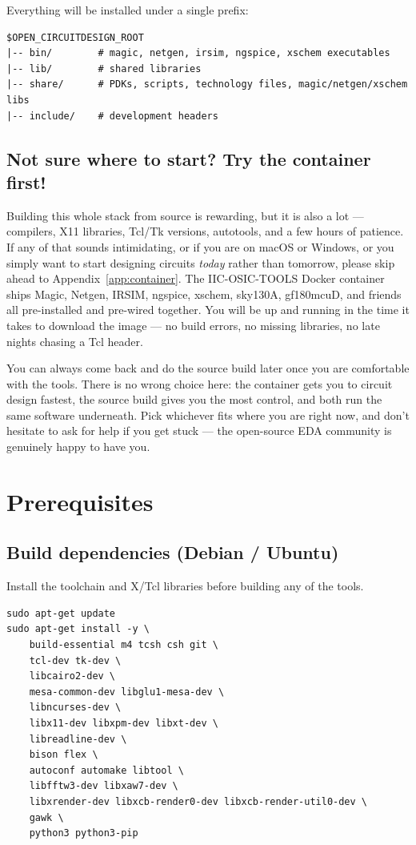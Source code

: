 \documentclass[11pt]{article}
\begin{document}
Everything will be installed under a single prefix:

\begin{lstlisting}
$OPEN_CIRCUITDESIGN_ROOT
|-- bin/        # magic, netgen, irsim, ngspice, xschem executables
|-- lib/        # shared libraries
|-- share/      # PDKs, scripts, technology files, magic/netgen/xschem libs
|-- include/    # development headers
\end{lstlisting}

\subsection*{Not sure where to start? Try the container first!}
 
Building this whole stack from source is rewarding, but it is also a lot
--- compilers, X11 libraries, Tcl/Tk versions, autotools, and a few hours
of patience. If any of that sounds intimidating, or if you are on macOS
or Windows, or you simply want to start designing circuits \emph{today}
rather than tomorrow, please skip ahead to
Appendix~\ref{app:container}. The IIC-OSIC-TOOLS Docker container ships
Magic, Netgen, IRSIM, ngspice, xschem, sky130A, gf180mcuD, and friends
all pre-installed and pre-wired together. You will be up and running in
the time it takes to download the image --- no build errors, no missing
libraries, no late nights chasing a Tcl header.
 
You can always come back and do the source build later once you are
comfortable with the tools. There is no wrong choice here: the container
gets you to circuit design fastest, the source build gives you the most
control, and both run the same software underneath. Pick whichever fits
where you are right now, and don't hesitate to ask for help if you get
stuck --- the open-source EDA community is genuinely happy to have you.

\section{Prerequisites}

\subsection{Build dependencies (Debian / Ubuntu)}

Install the toolchain and X/Tcl libraries before building any of the tools.

\begin{lstlisting}
sudo apt-get update
sudo apt-get install -y \
    build-essential m4 tcsh csh git \
    tcl-dev tk-dev \
    libcairo2-dev \
    mesa-common-dev libglu1-mesa-dev \
    libncurses-dev \
    libx11-dev libxpm-dev libxt-dev \
    libreadline-dev \
    bison flex \
    autoconf automake libtool \
    libfftw3-dev libxaw7-dev \
    libxrender-dev libxcb-render0-dev libxcb-render-util0-dev \
    gawk \
    python3 python3-pip
\end{lstlisting}
\end{document}
